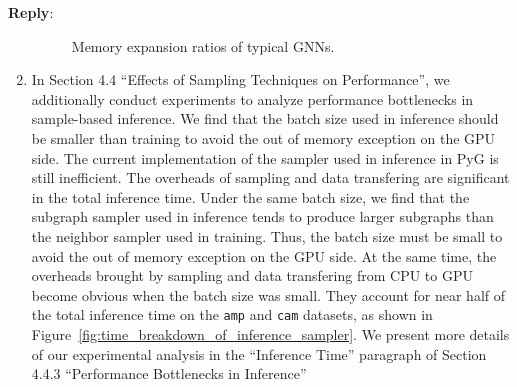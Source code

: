 \documentclass[12pt]{article}
\newenvironment{reply}
   {\medskip \noindent \textbf{Reply}:\  }
   {\medskip}
\begin{document}
\begin{reply}
\begin{enumerate}
    \begin{figure}[h]
        \caption{Memory expansion ratios of typical GNNs.}
        \label{fig:compare_memory_expasion_ratio}
    \end{figure}
    
    \item In Section 4.4 ``Effects of Sampling Techniques on Performance'', we additionally conduct experiments to analyze performance bottlenecks in sample-based inference.
    We find that the batch size used in inference should be smaller than training to avoid the out of memory exception on the GPU side.
    The current implementation of the sampler used in inference in PyG is still inefficient.
    The overheads of sampling and data transfering are significant in the total inference time.
    Under the same batch size, we find that the subgraph sampler used in inference tends to produce larger subgraphs than the neighbor sampler used in training.
    Thus, the batch size must be small to avoid the out of memory exception on the GPU side.
    At the same time, the overheads brought by sampling and data transfering from CPU to GPU become obvious when the batch size was small.
    They account for near half of the total inference time on the \texttt{amp} and \texttt{cam} datasets, as shown in Figure~\ref{fig:time_breakdown_of_inference_sampler}.
    We present more details of our experimental analysis in the ``Inference Time'' paragraph of Section 4.4.3 ``Performance Bottlenecks in Inference''
    

\end{enumerate}
\end{reply}
\end{document}
